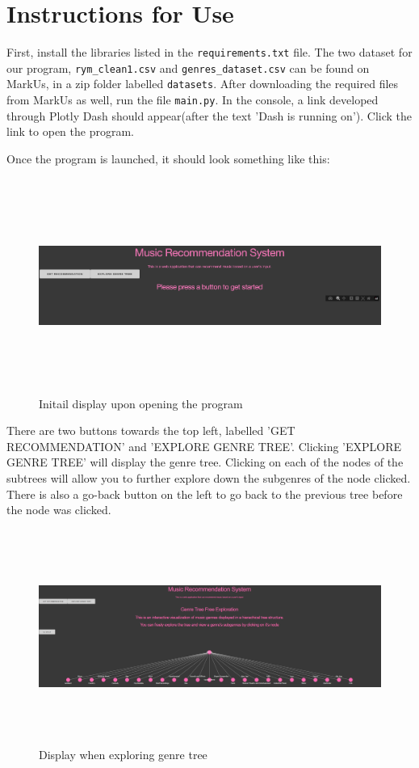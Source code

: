 \documentclass[fontsize=11pt]{article}
\begin{document}
\section*{Instructions for Use}
First, install the libraries listed in the \texttt{requirements.txt} file. The two dataset for our program, \texttt{rym\_clean1.csv} and \texttt{genres\_dataset.csv} can be found on MarkUs, in a zip folder labelled \texttt{datasets}. After downloading the required files from MarkUs as well, run the file \texttt{main.py}. In the console, a link developed through Plotly Dash should appear(after the text 'Dash is running on'). Click the link to open the program.

Once the program is launched, it should look something like this:

\begin{figure}[h]
    \centering
    \includegraphics[height=7cm, width=18cm]{examplelaunch.png}
    \caption{Initail display upon opening the program}
    \label{fig:my_label}
\end{figure}

There are two buttons towards the top left, labelled 'GET RECOMMENDATION' and 'EXPLORE GENRE TREE'. Clicking 'EXPLORE GENRE TREE' will display the genre tree. Clicking on each of the nodes of the subtrees will allow you to further explore down the subgenres of the node clicked. There is also a go-back button on the left to go back to the previous tree before the node was clicked.

\begin{figure}[h]
    \centering
    \includegraphics[height=7cm, width=18cm]{examplegenretree.png}
    \caption{Display when exploring genre tree}
    \label{fig:my_label}
\end{figure}
\end{document}
